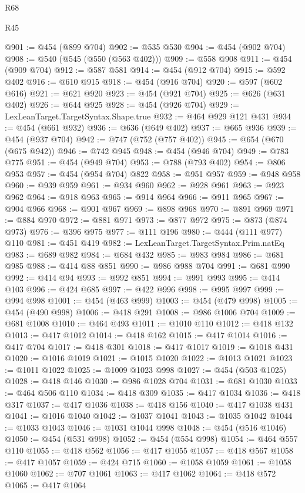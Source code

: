 \begin{lexlean}{R68}
\begin{lexlean}{R45}
\begin{coremodule}
{{{{{{{{{{{{{{{{{{{{{{{{{{{{{{{{{{{{{{{{{{{{{{{{{{{{{{{{{{{{{{{{{{{{{{{{{{{{{{{{{{{{{{{{{{{@901 := @454 (@899 @704)
@902 := @535 @530
@904 := @454 (@902 @704)
@908 := @540 (@545 (@550 (@563 @402)))
@909 := @558 @908
@911 := @454 (@909 @704)
@912 := @587 @581
@914 := @454 (@912 @704)
@915 := @592 @402
@916 := @610 @915
@918 := @454 (@916 @704)
@920 := @597 (@602 @616)
@921 := @621 @920
@923 := @454 (@921 @704)
@925 := @626 (@631 @402)
@926 := @644 @925
@928 := @454 (@926 @704)
@929 := LexLeanTarget.TargetSyntax.Shape.true
@932 := @464 @929 @121 @431
@934 := @454 (@661 @932)
@936 := @636 (@649 @402)
@937 := @665 @936
@939 := @454 (@937 @704)
@942 := @747 (@752 (@757 @402))
@945 := @654 (@670 (@675 @942))
@946 := @742 @945
@948 := @454 (@946 @704)
@949 := @783 @775
@951 := @454 (@949 @704)
@953 := @788 (@793 @402)
@954 := @806 @953
@957 := @454 (@954 @704) @822
@958 := @951 @957
@959 := @948 @958
@960 := @939 @959
@961 := @934 @960
@962 := @928 @961
@963 := @923 @962
@964 := @918 @963
@965 := @914 @964
@966 := @911 @965
@967 := @904 @966
@968 := @901 @967
@969 := @898 @968
@970 := @891 @969
@971 := @884 @970
@972 := @881 @971
@973 := @877 @972
@975 := @873 (@874 @973)
@976 := @396 @975
@977 := @111 @196
@980 := @444 (@111 @977) @110
@981 := @451 @419
@982 := LexLeanTarget.TargetSyntax.Prim.natEq
@983 := @689 @982
@984 := @684 @432
@985 := @983 @984
@986 := @681 @985
@988 := @414 @88 @851
@990 := @986 @988 @704
@991 := @681 @990
@992 := @414 @94
@993 := @992 @851
@994 := @991 @993
@995 := @414 @103
@996 := @424 @685
@997 := @422 @996
@998 := @995 @997
@999 := @994 @998
@1001 := @454 (@463 @999)
@1003 := @454 (@479 @998)
@1005 := @454 (@490 @998)
@1006 := @418 @291
@1008 := @986 @1006 @704
@1009 := @681 @1008
@1010 := @464 @493
@1011 := @1010 @110
@1012 := @418 @132
@1013 := @417 @1012
@1014 := @418 @162
@1015 := @417 @1014
@1016 := @417 @704
@1017 := @418 @301
@1018 := @417 @1017
@1019 := @1018 @431
@1020 := @1016 @1019
@1021 := @1015 @1020
@1022 := @1013 @1021
@1023 := @1011 @1022
@1025 := @1009 @1023 @998
@1027 := @454 (@503 @1025)
@1028 := @418 @146
@1030 := @986 @1028 @704
@1031 := @681 @1030
@1033 := @464 @506 @110
@1034 := @418 @309
@1035 := @417 @1034
@1036 := @418 @317
@1037 := @417 @1036
@1038 := @418 @156
@1040 := @417 @1038 @431
@1041 := @1016 @1040
@1042 := @1037 @1041
@1043 := @1035 @1042
@1044 := @1033 @1043
@1046 := @1031 @1044 @998
@1048 := @454 (@516 @1046)
@1050 := @454 (@531 @998)
@1052 := @454 (@554 @998)
@1054 := @464 @557 @110
@1055 := @418 @562
@1056 := @417 @1055
@1057 := @418 @567
@1058 := @417 @1057
@1059 := @424 @715
@1060 := @1058 @1059
@1061 := @1058 @1060
@1062 := @707 @1061
@1063 := @417 @1062
@1064 := @418 @572
@1065 := @417 @1064
}}}}}}}}}}}}}}}}}}}}}}}}}}}}}}}}}}}}}}}}}}}}}}}}}}}}}}}}}}}}}}}}}}}}}}}}}}}}}}}}}}}}}}}}}}}
\end{coremodule}
\end{lexlean}
\end{lexlean}
